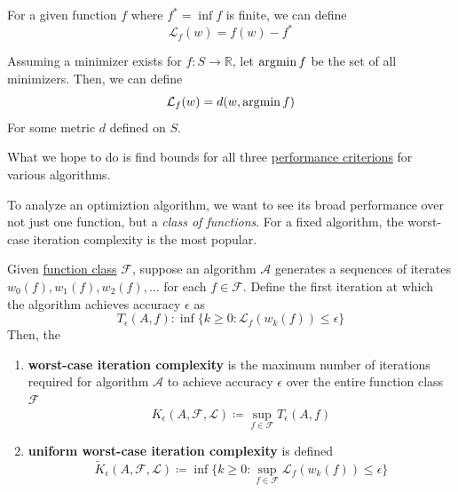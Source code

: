 \begin{example}
  \label{ex:function-suboptimality}
	For a given function $f$ where $f^\ast = \inf f$ is finite, we can define 
	\begin{equation}
		\mathcal{L}_f (w) = f(w) - f^\ast
	\end{equation}
\end{example}

\begin{example}
  \label{ex:distance-to-the-minimizer}
	Assuming a minimizer exists for $f: S \to \mathbb{R}$, let $\operatorname*{\arg\!\min}{f}$ be the set of all minimizers. Then, we can define 
	\begin{equation}
		\mathcal{L}_f (w) = d(w, \operatorname*{\arg\!\min}{f})
	\end{equation}
	For some metric $d$ defined on $S$.  
\end{example}

What we hope to do is find bounds for all three \hyperref[def:performance-criterion]{performance criterions} for various algorithms. 

To analyze an optimiztion algorithm, we want to see its broad performance over not just one function, but a \textit{class of functions}. For a fixed algorithm, the worst-case iteration complexity is the most popular. 

\begin{definition}
  \label{def:worst-case-iteration-complexity}
	Given \hyperref[def:function-class]{function class} $\mathcal{F}$, suppose an algorithm $\mathcal{A}$ generates a sequences of iterates $w_0 (f), w_1 (f), w_2 (f), \ldots$ for each $f \in \mathcal{F}$. Define the first iteration at which the algorithm achieves accuracy $\epsilon$ as 
	\begin{equation}
		T_\epsilon(A, f) \colon \inf \{ k \geq 0 \colon \mathcal{L}_f (w_k (f)) \leq \epsilon \}
	\end{equation}
	Then, the 
	\begin{enumerate}
	  \item \textbf{worst-case iteration complexity} is the maximum number of iterations required for algorithm $\mathcal{A}$ to achieve accuracy $\epsilon$ over the entire function class $\mathcal{F}$
			\begin{equation}
				K_\epsilon(A, \mathcal{F}, \mathcal{L}) \coloneqq \sup_{f \in \mathcal{F}} T_\epsilon (A, f)
			\end{equation}

		\item \textbf{uniform worst-case iteration complexity} is defined 
			\begin{equation}
				\widetilde{K}_\epsilon(A, \mathcal{F}, \mathcal{L}) \coloneqq \inf \big\{ k \geq 0 \colon \sup_{f \in \mathcal{F}} \mathcal{L}_f (w_k (f)) \leq \epsilon \big\}
			\end{equation}
	\end{enumerate}
\end{definition}

